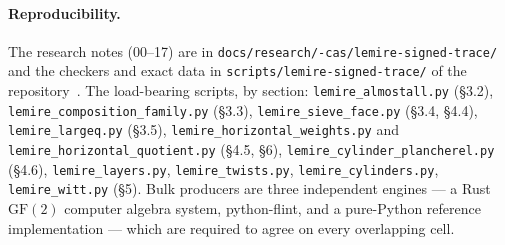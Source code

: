 \documentclass[10pt]{article}
\theoremstyle{plain}
\theoremstyle{definition}
\begin{document}
\paragraph{Reproducibility.} The research notes (00--17) are in
\texttt{docs/\allowbreak research/-cas/\allowbreak lemire-signed-trace/} and the checkers and exact
data in \texttt{scripts/lemire-signed-trace/} of the
repository~\cite{ledger}. The load-bearing scripts, by section:
\texttt{lemire\_almostall.py} (\S3.2), \texttt{lemire\_composition\_family.py}
(\S3.3), \texttt{lemire\_sieve\_face.py} (\S3.4, \S4.4),
\texttt{lemire\_largeq.py} (\S3.5), \texttt{lemire\_horizontal\_weights.py} and
\texttt{lemire\_horizontal\_quotient.py} (\S4.5, \S6),
\texttt{lemire\_cylinder\_plancherel.py} (\S4.6),
\texttt{lemire\_layers.py}, \texttt{lemire\_twists.py},
\texttt{lemire\_cylinders.py}, \texttt{lemire\_witt.py} (\S5). Bulk producers
are three independent engines --- a Rust $\mathrm{GF}(2)$ computer algebra
system, python-flint, and a pure-Python reference implementation --- which are
required to agree on every overlapping cell.
\end{document}
